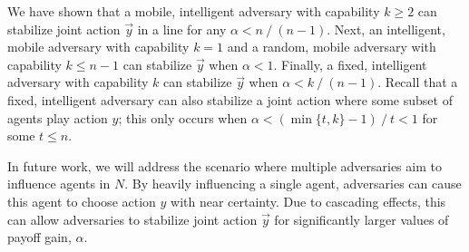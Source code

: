 
We have shown that a mobile, intelligent adversary with capability $k\geq 2$ can stabilize joint action $\vec{y}$ in a line for any $\alpha < {n\mathop{/}(n-1)}$. Next, an intelligent, mobile adversary with capability $k=1$ and a random, mobile adversary with capability $k\leq n-1$ can stabilize $\vec{y}$ when $\alpha <1$. Finally, a fixed, intelligent adversary with capability $k$ can stabilize $\vec{y}$ when $\alpha < k\mathop{/}(n-1)$. %
Recall that a fixed, intelligent adversary can also stabilize a joint action where some subset of agents play action $y$; this only occurs when $\alpha <(\min\{t,k\}-1)\mathop{/} t < 1$ for some $t\leq n$.



In future work, we will address the scenario where multiple adversaries aim to influence agents in $N$.%
By heavily influencing a single agent, adversaries can cause this agent to choose action $y$ with near certainty. Due to cascading effects, this can allow adversaries to stabilize joint action $\vec{y}$ for significantly larger values of payoff gain, $\alpha.$

